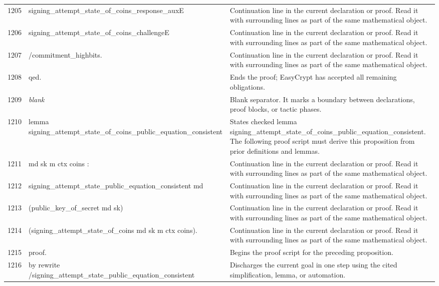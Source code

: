 \documentclass[10pt]{article}
\begin{document}
\begin{longtable}{r L{0.53\textwidth} L{0.37\textwidth}}
1205 & {\ttfamily\scriptsize            signing\_attempt\_state\_of\_coins\_response\_auxE} & Continuation line in the current declaration or proof.  Read it with surrounding lines as part of the same mathematical object. \\
1206 & {\ttfamily\scriptsize            signing\_attempt\_state\_of\_coins\_challengeE} & Continuation line in the current declaration or proof.  Read it with surrounding lines as part of the same mathematical object. \\
1207 & {\ttfamily\scriptsize            /commitment\_highbits.} & Continuation line in the current declaration or proof.  Read it with surrounding lines as part of the same mathematical object. \\
1208 & {\ttfamily\scriptsize qed.} & Ends the proof; EasyCrypt has accepted all remaining obligations. \\
1209 & {\ttfamily\scriptsize \emph{blank}} & Blank separator.  It marks a boundary between declarations, proof blocks, or tactic phases. \\
1210 & {\ttfamily\scriptsize lemma signing\_attempt\_state\_of\_coins\_public\_equation\_consistent} & States checked lemma signing\_attempt\_state\_of\_coins\_public\_equation\_consistent.  The following proof script must derive this proposition from prior definitions and lemmas. \\
1211 & {\ttfamily\scriptsize    md sk m ctx coins :} & Continuation line in the current declaration or proof.  Read it with surrounding lines as part of the same mathematical object. \\
1212 & {\ttfamily\scriptsize   signing\_attempt\_state\_public\_equation\_consistent md} & Continuation line in the current declaration or proof.  Read it with surrounding lines as part of the same mathematical object. \\
1213 & {\ttfamily\scriptsize     (public\_key\_of\_secret md sk)} & Continuation line in the current declaration or proof.  Read it with surrounding lines as part of the same mathematical object. \\
1214 & {\ttfamily\scriptsize     (signing\_attempt\_state\_of\_coins md sk m ctx coins).} & Continuation line in the current declaration or proof.  Read it with surrounding lines as part of the same mathematical object. \\
1215 & {\ttfamily\scriptsize proof.} & Begins the proof script for the preceding proposition. \\
1216 & {\ttfamily\scriptsize by rewrite /signing\_attempt\_state\_public\_equation\_consistent} & Discharges the current goal in one step using the cited simplification, lemma, or automation. \\

\end{longtable}
\end{document}
